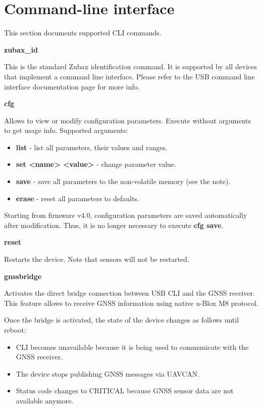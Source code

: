 \documentclass{zubaxdoc}
\begin{document}
\section{Command-line interface}

This section documents supported CLI commands.

\textbf{zubax{\_}id}

This is the standard Zubax identification command. It is supported by all devices that implement a command line interface. Please refer to the USB command line interface documentation page for more info.

\textbf{cfg}

Allows to view or modify configuration parameters.
Execute without arguments to get usage info. Supported arguments:
\begin{itemize}
\item \textbf{list} - list all parameters, their values and ranges.
\item \textbf{set <name> <value>} - change parameter value.
\item \textbf{save} - save all parameters to the non-volatile memory (see the note).
\item \textbf{erase} - reset all parameters to defaults.
\end{itemize}

Starting from firmware v4.0, configuration parameters are saved automatically after modification. Thus, it is no longer necessary to execute \textbf{cfg save}.

\textbf{reset}

Restarts the device. Note that sensors will not be restarted.

\textbf{gnssbridge}

Activates the direct bridge connection between USB CLI and the GNSS receiver. This feature allows to receive GNSS information using native u-Blox M8 protocol.

Once the bridge is activated, the state of the device changes as follows until reboot:
\begin{itemize}
\item CLI becomes unavailable because it is being used to communicate with the GNSS receiver.
\item The device stops publishing GNSS messages via UAVCAN.
\item Status code changes to CRITICAL because GNSS sensor data are not available anymore.
\end{itemize}
\end{document}
